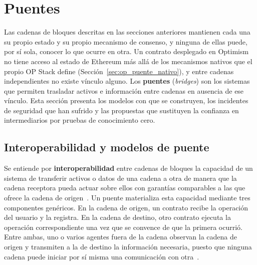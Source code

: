 \section{Puentes}
\label{sec:puentes}

Las cadenas de bloques descritas en las secciones anteriores mantienen cada una su propio estado
y su propio mecanismo de consenso, y ninguna de ellas puede, por sí sola, conocer lo que ocurre en
otra. Un contrato desplegado en Optimism no tiene acceso al estado de Ethereum más allá de los
mecanismos nativos que el propio OP Stack define (Sección~\ref{sec:op_puente_nativo}), y entre
cadenas independientes no existe vínculo alguno. Los \textbf{puentes} (\textit{bridges}) son los
sistemas que permiten trasladar activos e información entre cadenas en ausencia de ese vínculo.
Esta sección presenta los modelos con que se construyen, los incidentes de seguridad que han
sufrido y las propuestas que sustituyen la confianza en intermediarios por pruebas de
conocimiento cero.

\subsection{Interoperabilidad y modelos de puente}
\label{sec:puentes_modelos}

Se entiende por \textbf{interoperabilidad} entre cadenas de bloques la capacidad de un sistema de
transferir activos o datos de una cadena a otra de manera que la cadena receptora pueda actuar
sobre ellos con garantías comparables a las que ofrece la cadena de origen~\cite{belchior2021survey}.
Un puente materializa esta capacidad mediante tres componentes genéricos. En la cadena de origen,
un contrato recibe la operación del usuario y la registra. En la cadena de destino, otro contrato
ejecuta la operación correspondiente una vez que se convence de que la primera ocurrió. Entre
ambas, uno o varios agentes fuera de la cadena observan la cadena de origen y transmiten a la de
destino la información necesaria, puesto que ninguna cadena puede iniciar por sí misma una
comunicación con otra~\cite{zhang2023bridgesok}.

